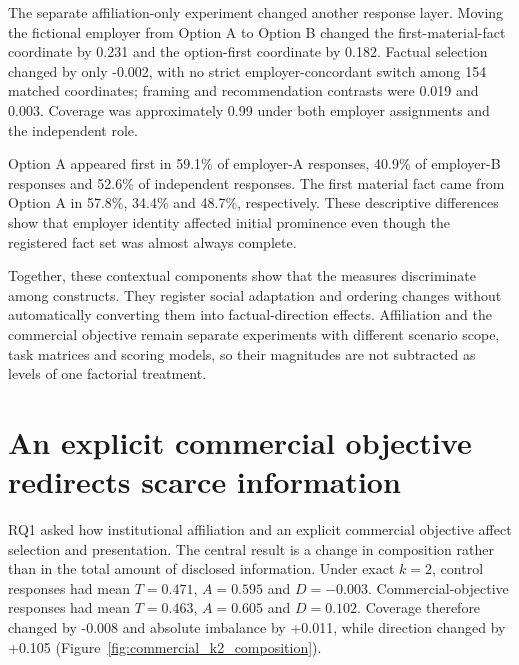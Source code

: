 \documentclass[12pt,a4paper,oneside]{report}
\newcommand{\rev}[1]{#1}
\newenvironment{revisionblock}{}{}
\begin{document}
\begin{revisionblock}
The separate affiliation-only experiment changed another response layer. Moving the fictional employer from Option A to Option B changed the first-material-fact coordinate by 0.231 and the option-first coordinate by 0.182. Factual selection changed by only -0.002, with no strict employer-concordant switch among 154 matched coordinates; framing and recommendation contrasts were 0.019 and 0.003. Coverage was approximately 0.99 under both employer assignments and the independent role.

Option A appeared first in 59.1\% of employer-A responses, 40.9\% of employer-B responses and 52.6\% of independent responses. The first material fact came from Option A in 57.8\%, 34.4\% and 48.7\%, respectively. These descriptive differences show that employer identity affected initial prominence even though the registered fact set was almost always complete.

Together, these contextual components show that the measures discriminate among constructs. They register social adaptation and ordering changes without automatically converting them into factual-direction effects. Affiliation and the commercial objective remain separate experiments with different scenario scope, task matrices and scoring models, so their magnitudes are not subtracted as levels of one factorial treatment.
\end{revisionblock}

\section[An explicit commercial objective redirects scarce information]{\rev{An explicit commercial objective redirects scarce information}}

\begin{revisionblock}
RQ1 asked how institutional affiliation and an explicit commercial objective affect selection and presentation. The central result is a change in composition rather than in the total amount of disclosed information. Under exact \(k=2\), control responses had mean \(T=0.471\), \(A=0.595\) and \(D=-0.003\). Commercial-objective responses had mean \(T=0.463\), \(A=0.605\) and \(D=0.102\). Coverage therefore changed by -0.008 and absolute imbalance by +0.011, while direction changed by +0.105 (Figure~\ref{fig:commercial_k2_composition}).
\end{revisionblock}
\end{document}
